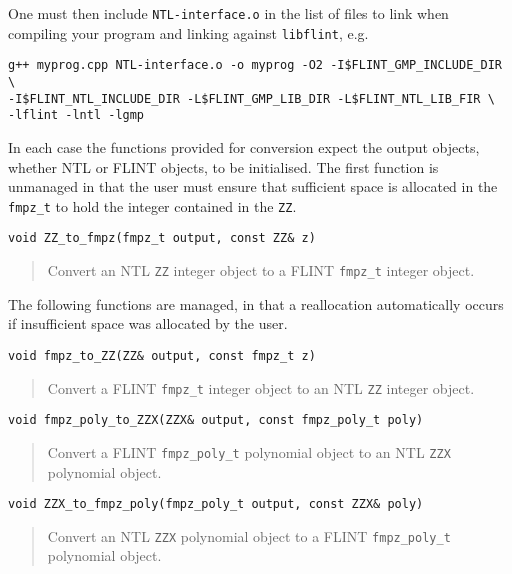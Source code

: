 \documentclass[a4paper,10pt]{article}
\newcommand{\code}{\lstinline}
\begin{document}
One must then include \code{NTL-interface.o} in the list of files to link when compiling your program and linking against \code{libflint}, e.g.

\begin{lstlisting}
g++ myprog.cpp NTL-interface.o -o myprog -O2 -I$FLINT_GMP_INCLUDE_DIR \
-I$FLINT_NTL_INCLUDE_DIR -L$FLINT_GMP_LIB_DIR -L$FLINT_NTL_LIB_FIR \
-lflint -lntl -lgmp
\end{lstlisting}

In each case the functions provided for conversion expect the output objects, whether NTL or FLINT objects, to be initialised. The first function is unmanaged in that the 
user must ensure that sufficient space is allocated in the \code{fmpz_t} to hold the integer contained in the \code{ZZ}.

\begin{lstlisting}
void ZZ_to_fmpz(fmpz_t output, const ZZ& z)
\end{lstlisting}
\begin{quote}
Convert an NTL \code{ZZ} integer object to a FLINT \code{fmpz_t} integer object.
\end{quote}

The following functions are managed, in that a reallocation automatically occurs if insufficient space was allocated by the user.

\begin{lstlisting}
void fmpz_to_ZZ(ZZ& output, const fmpz_t z)
\end{lstlisting}
\begin{quote}
Convert a FLINT \code{fmpz_t} integer object to an NTL \code{ZZ} integer object.
\end{quote}

\begin{lstlisting}
void fmpz_poly_to_ZZX(ZZX& output, const fmpz_poly_t poly)
\end{lstlisting}
\begin{quote}
Convert a FLINT \code{fmpz_poly_t} polynomial object to an NTL \code{ZZX} polynomial object.
\end{quote}

\begin{lstlisting}
void ZZX_to_fmpz_poly(fmpz_poly_t output, const ZZX& poly)
\end{lstlisting}
\begin{quote}
Convert an NTL \code{ZZX} polynomial object to a FLINT \code{fmpz_poly_t} polynomial object.
\end{quote}
\end{document}
